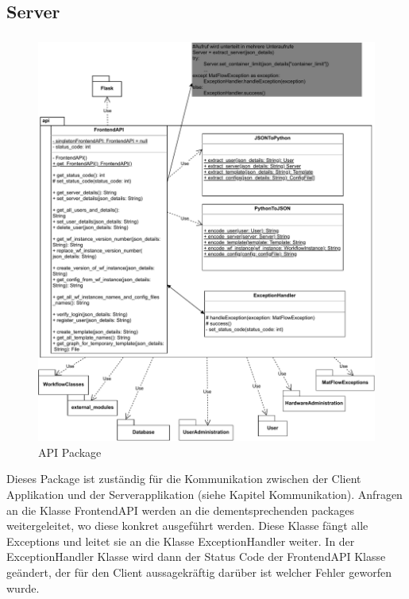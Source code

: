 \subsection{Server}

\subsubsection{}
\begin{figure}[H]
    \includegraphics[width=1\textwidth]{res/api.drawio.pdf}
    \caption{API Package}
\end{figure}
Dieses Package ist zuständig für die Kommunikation zwischen der Client Applikation und der Serverapplikation (siehe Kapitel 
Kommunikation). Anfragen an die Klasse FrontendAPI werden an die dementsprechenden packages weitergeleitet, wo diese konkret 
ausgeführt werden. Diese Klasse fängt alle Exceptions und leitet sie an die Klasse ExceptionHandler weiter.
In der ExceptionHandler Klasse wird dann der Status Code der FrontendAPI Klasse geändert, der für den Client aussagekräftig
darüber ist welcher Fehler geworfen wurde.

